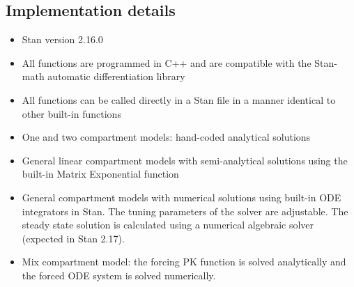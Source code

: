 \documentclass[11pt]{amsart}
\begin{document}
\subsection{Implementation details}
\begin{itemize}
  \item Stan version 2.16.0
  \item All functions are programmed in C++ and are compatible with the Stan-math automatic differentiation library \cite{Carpenter:2015}
  \item All functions can be called directly in a Stan file in a manner identical to other built-in functions
  \item One and two compartment models: hand-coded analytical solutions
  \item General linear compartment models with semi-analytical solutions using the built-in Matrix Exponential function
  \item General compartment models with numerical solutions using built-in ODE integrators in Stan. The tuning parameters of the solver are adjustable. The steady state solution is calculated using a numerical algebraic solver (expected in Stan 2.17).
  \item Mix compartment model: the forcing PK function is solved analytically and the forced ODE system is solved numerically.
\end{itemize}
\end{document}
